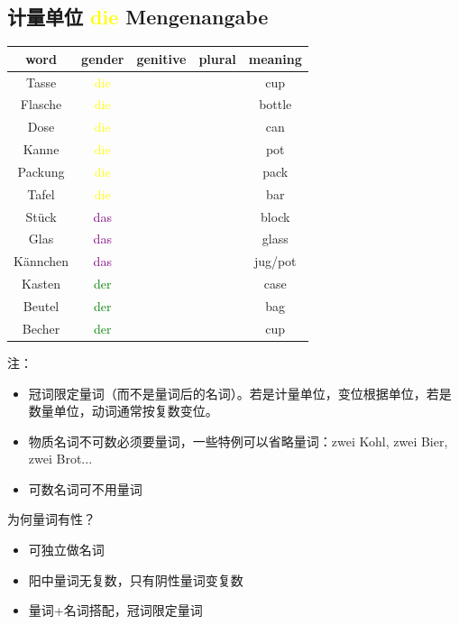 \subsection{计量单位 \textcolor{yellow}{die} Mengenangabe}
\begin{center}
    \begin{tabular} {|c|c|c|c|c|}
        \hline
        \rowcolor{gray}
        word     & gender                  & genitive & plural & meaning \\
        \hline
        Tasse    & \textcolor{yellow}{die} &          &        & cup     \\
        Flasche  & \textcolor{yellow}{die} &          &        & bottle  \\
        Dose     & \textcolor{yellow}{die} &          &        & can     \\
        Kanne    & \textcolor{yellow}{die} &          &        & pot     \\
        Packung  & \textcolor{yellow}{die} &          &        & pack    \\
        Tafel    & \textcolor{yellow}{die} &          &        & bar     \\
        \hline
        Stück    & \textcolor{purple}{das} &          &        & block   \\
        Glas     & \textcolor{purple}{das} &          &        & glass   \\
        Kännchen & \textcolor{purple}{das} &          &        & jug/pot \\
        \hline
        Kasten   & \textcolor{green}{der}  &          &        & case    \\
        Beutel   & \textcolor{green}{der}  &          &        & bag     \\
        Becher   & \textcolor{green}{der}  &          &        & cup     \\
        \hline
    \end{tabular}
\end{center}

\label{sec:num:unit}
注：
\begin{itemize}
    \item 冠词限定量词（而不是量词后的名词）。若是计量单位，变位根据单位，若是数量单位，动词通常按复数变位。
    \item 物质名词不可数必须要量词，一些特例可以省略量词：zwei Kohl, zwei Bier, zwei Brot...
    \item 可数名词可不用量词
\end{itemize}
为何量词有性？
\begin{itemize}
    \item 可独立做名词
    \item 阳中量词无复数，只有阴性量词变复数
    \item 量词+名词搭配，冠词限定量词
\end{itemize}

